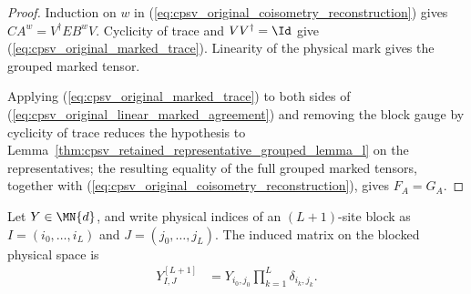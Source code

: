\begin{proof}\leanok
    Induction on $w$ in (\ref{eq:cpsv_original_coisometry_reconstruction})
    gives
    $CA^w=V^\dagger EB^wV$. Cyclicity of trace and $VV^\dagger=\Id$ give
    (\ref{eq:cpsv_original_marked_trace}). Linearity of the physical mark
    gives the grouped marked tensor.

    Applying (\ref{eq:cpsv_original_marked_trace}) to both sides of
    (\ref{eq:cpsv_original_linear_marked_agreement}) and removing the block
    gauge by cyclicity of trace reduces the hypothesis to
    Lemma~\ref{thm:cpsv_retained_representative_grouped_lemma_l} on the
    representatives; the resulting equality of the full grouped
    marked tensors, together with
    (\ref{eq:cpsv_original_coisometry_reconstruction}), gives $F_A=G_A$.
\end{proof}

\begin{definition}
    \label{def:first_site_action_physical_blocking}
    \leanok
    Let $Y\in\MN{d}$, and write physical indices of an $(L+1)$-site block
    as $I=(i_0,\ldots,i_L)$ and $J=(j_0,\ldots,j_L)$. The induced matrix on
    the blocked physical space is
    \begin{align}
        Y^{[L+1]}_{I,J}
         & =Y_{i_0,j_0}\prod_{k=1}^{L}\delta_{i_k,j_k}.
        \label{eq:mpdo_first_site_block}
    \end{align}
\end{definition}

